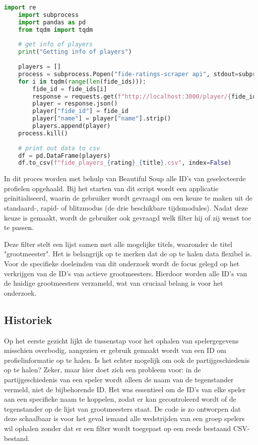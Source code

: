 \begin{lstlisting}[language=Python]
    import re
    import subprocess
    import pandas as pd
    from tqdm import tqdm
    
    # get info of players
    print("Getting info of players")
    
    players = []
    process = subprocess.Popen("fide-ratings-scraper api", stdout=subprocess.PIPE, stderr=subprocess.PIPE, shell=True)
    for i in tqdm(range(len(fide_ids))):
        fide_id = fide_ids[i]
        response = requests.get(f"http://localhost:3000/player/{fide_id}/info")
        player = response.json()
        player["fide_id"] = fide_id
        player["name"] = player["name"].strip()
        players.append(player)
    process.kill()
    
    # print out data to csv
    df = pd.DataFrame(players)
    df.to_csv(f"fide_players_{rating}_{title}.csv", index=False)
\end{lstlisting}

In dit proces worden met behulp van Beautiful Soup alle ID's van geselecteerde profielen opgehaald. Bij het starten van dit script wordt een applicatie geïnitialiseerd, waarin de gebruiker wordt gevraagd om een keuze te maken uit de standaard-, rapid- of blitzmodus (de drie beschikbare tijdsmodules). Nadat deze keuze is gemaakt, wordt de gebruiker ook gevraagd welk filter hij of zij wenst toe te passen.

Deze filter stelt een lijst samen met alle mogelijke titels, waaronder de titel "grootmeester". Het is belangrijk op te merken dat de op te halen data flexibel is. Voor de specifieke doeleinden van dit onderzoek wordt de focus gelegd op het verkrijgen van de ID's van actieve grootmeesters. Hierdoor worden alle ID's van de huidige grootmeesters verzameld, wat van cruciaal belang is voor het onderzoek.\autocite{NumFocus}

\subsection{Historiek}

Op het eerste gezicht lijkt de tussenstap voor het ophalen van spelergegevens misschien overbodig, aangezien er gebruik gemaakt wordt van een ID om profielinformatie op te halen. Is het echter mogelijk om ook de partijgeschiedenis op te halen? Zeker, maar hier doet zich een probleem voor: in de partijgeschiedenis van een speler wordt alleen de naam van de tegenstander vermeld, niet de bijbehorende ID. Het was essentieel om de ID's van elke speler aan een specifieke naam te koppelen, zodat er kan gecontroleerd wordt of de tegenstander op de lijst van grootmeesters staat. De code is zo ontworpen dat deze schaalbaar is voor het geval iemand alle wedstrijden van een groep spelers wil ophalen zonder dat er een filter wordt toegepast op een reeds bestaand CSV-bestand.

